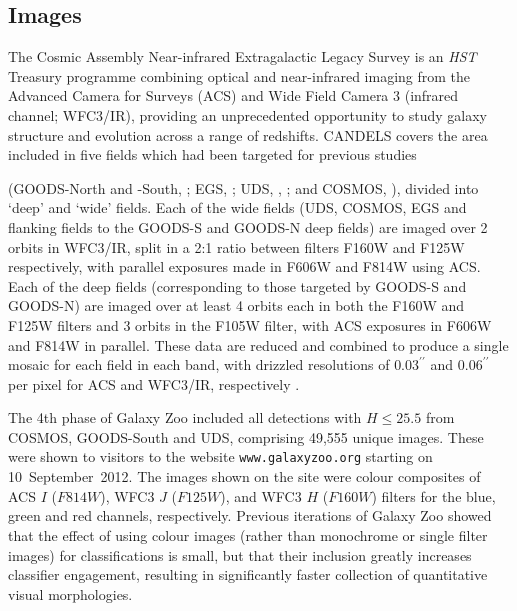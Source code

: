 \documentclass[useAMS,usenatbib]{mn2e}
\begin{document}
\subsection{Images}\label{sec:images}

The Cosmic Assembly Near-infrared Extragalactic Legacy Survey \citep[CANDELS;][]{grogin11,koekemoer11} is an \emph{HST} Treasury programme combining optical and near-infrared imaging from the Advanced Camera for Surveys (ACS) and Wide Field Camera 3 (infrared channel; WFC3/IR), providing an unprecedented opportunity to study galaxy structure and evolution across a range of redshifts. CANDELS covers the area included in five fields which had been targeted for previous studies {(GOODS-North and -South, \citeauthor{giavalisco04} \citeyear{giavalisco04}; EGS, \citeauthor{davis07} \citeyear{davis07}; UDS, \citeauthor{lawrence07} \citeyear{lawrence07}, \citeauthor{cirasuolo07} \citeyear{cirasuolo07}; and COSMOS, \citeauthor{scoville07} \citeyear{scoville07}), divided into `deep' and `wide' fields. Each of the wide fields (UDS, COSMOS, EGS and flanking fields to the GOODS-S and GOODS-N deep fields) are imaged over 2 orbits in WFC3/IR, split in a 2:1 ratio between filters F160W and F125W respectively, with parallel exposures made in F606W and F814W using ACS. Each of the deep fields (corresponding to those targeted by GOODS-S and GOODS-N) are imaged over at least 4 orbits each in both the F160W and F125W filters and 3 orbits in the F105W filter, with ACS exposures in F606W and F814W in parallel. These data are reduced and combined to produce a single mosaic for each field in each band, with drizzled resolutions of $0.03^{\prime\prime}$ and $0.06^{\prime\prime}$ per pixel for ACS and WFC3/IR, respectively \citep{koekemoer11}.

The 4th phase of Galaxy Zoo included all detections with $H \leq 25.5$ from COSMOS, GOODS-South and UDS, comprising 49,555 unique images. These were shown to visitors to the website {\tt www.galaxyzoo.org} starting on 10~September~2012. The images shown on the site were colour composites of ACS $I$ ($F814W$), WFC3 $J$ ($F125W$), and WFC3 $H$ ($F160W$) filters for the blue, green and red channels, respectively. Previous iterations of Galaxy Zoo \citep{lintott08} showed that the effect of using colour images (rather than monochrome or single filter images) for classifications is small, but that their inclusion greatly increases classifier engagement, resulting in significantly faster collection of quantitative visual morphologies. 

}
\end{document}
